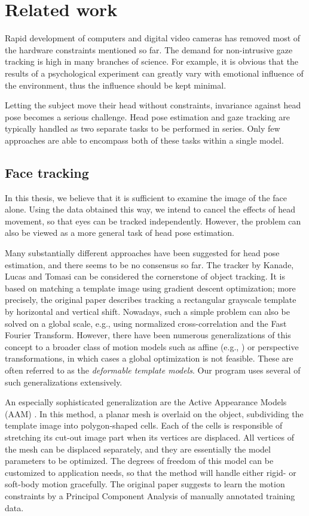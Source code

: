 \section{Related work}

Rapid development of computers and digital video cameras has removed most of the hardware constraints mentioned so far.
The demand for non-intrusive gaze tracking is high in many branches of science.
For example, it is obvious that the results of a psychological experiment can greatly vary with emotional influence of the environment, thus the influence should be kept minimal.

Letting the subject move their head without constraints, invariance against head pose becomes a serious challenge.
Head pose estimation and gaze tracking are typically handled as two separate tasks to be performed in series.
Only few approaches are able to encompass both of these tasks within a single model.

\subsection{Face tracking}
In this thesis, we believe that it is sufficient to examine the image of the face alone.
Using the data obtained this way, we intend to cancel the effects of head movement, so that eyes can be tracked independently.
However, the problem can also be viewed as a more general task of head pose estimation.

Many substantially different approaches have been suggested for head pose estimation, and there seems to be no consensus so far.
The tracker by Kanade, Lucas and Tomasi \cite{lucas81} can be considered the cornerstone of object tracking.
It is based on matching a template image using gradient descent optimization; more precisely, the original paper describes tracking a rectangular grayscale template by horizontal and vertical shift.
Nowadays, such a simple problem can also be solved on a global scale, e.g., using normalized cross-correlation and the Fast Fourier Transform.
However, there have been numerous generalizations of this concept to a broader class of motion models such as affine (e.g., \cite{bouguet01}) or perspective transformations, in which cases a global optimization is not feasible.
These are often referred to as the \textit{deformable template models}.
Our program uses several of such generalizations extensively.

An especially sophisticated generalization are the Active Appearance Models (AAM) \cite{cootes01,stegmann00}.
In this method, a planar mesh is overlaid on the object, subdividing the template image into polygon-shaped cells.
Each of the cells is responsible of stretching its cut-out image part when its vertices are displaced.
All vertices of the mesh can be displaced separately, and they are essentially the model parameters to be optimized.
The degrees of freedom of this model can be customized to application needs, so that the method will handle either rigid- or soft-body motion gracefully.
The original paper suggests to learn the motion constraints by a Principal Component Analysis of manually annotated training data.

